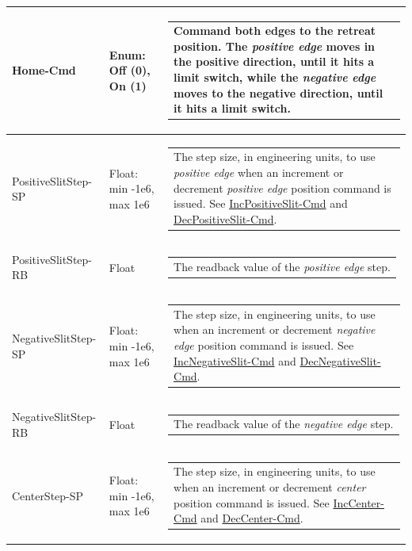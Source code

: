\documentclass[openany]{article}
\begin{document}
\begin{longtable}{| m{4.5cm} m{2.5cm}  m{7.0cm} |}
        Home-Cmd & Enum: Off (0), On (1) & \begin{tabular}{@{}m{6cm}@{}}
                Command both edges to the retreat position. The \emph{positive edge} moves in the positive direction, until it hits a limit switch, while the \emph{negative edge} moves to the negative direction, until it hits a limit switch.
            \end{tabular} \hypertarget{pv:positive-edge-step}{}\\ \hline
        PositiveSlitStep-SP & Float: min -1e6, max 1e6 & \begin{tabular}{@{}m{6cm}@{}}
                The step size, in engineering units, to use \emph{positive edge} when an increment or decrement \emph{positive edge} position command is issued. See \hyperlink{pv:inc-positive-edge-cmd}{IncPositiveSlit-Cmd} and \hyperlink{pv:dec-positive-edge-cmd}{DecPositiveSlit-Cmd}.
            \end{tabular} \hypertarget{}{}\\ \hline
        PositiveSlitStep-RB & Float & \begin{tabular}{@{}m{6cm}@{}}
                The readback value of the \emph{positive edge} step.
            \end{tabular} \hypertarget{pv:negative-edge-step}{}\\ \hline
        NegativeSlitStep-SP & Float: min -1e6, max 1e6 & \begin{tabular}{@{}m{6cm}@{}}
                The step size, in engineering units, to use when an increment or decrement \emph{negative edge} position command is issued. See \hyperlink{pv:inc-negative-edge-cmd}{IncNegativeSlit-Cmd} and \hyperlink{pv:dec-negative-edge-cmd}{DecNegativeSlit-Cmd}.
            \end{tabular} \hypertarget{}{}\\ \hline
        NegativeSlitStep-RB & Float & \begin{tabular}{@{}m{6cm}@{}}
                The readback value of the \emph{negative edge} step.
            \end{tabular} \hypertarget{pv:center-step}{}\\ \hline
        CenterStep-SP & Float: min -1e6, max 1e6 & \begin{tabular}{@{}m{6cm}@{}}
                The step size, in engineering units, to use when an increment or decrement \emph{center} position command is issued. See \hyperlink{pv:inc-center-cmd}{IncCenter-Cmd} and \hyperlink{pv:dec-center-cmd}{DecCenter-Cmd}.

\end{tabular}
\end{longtable}
\end{document}
